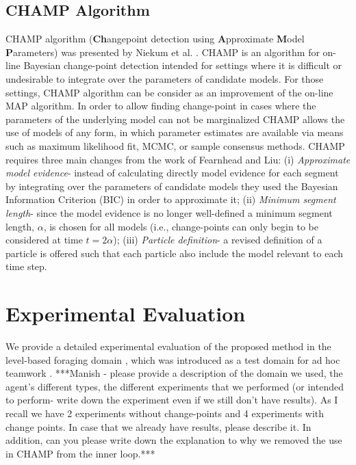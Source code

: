 \documentclass{article}
\begin{document}
\subsection{CHAMP Algorithm}
CHAMP algorithm (\textbf{Ch}angepoint detection using \textbf{A}pproximate \textbf{M}odel \textbf{P}arameters) was presented by Niekum et al. \cite{niekum2014champ}. CHAMP is an algorithm for on-line Bayesian change-point detection intended for settings where it is difficult or undesirable to integrate over the parameters of candidate models. For those settings, CHAMP algorithm can be consider as an improvement of the on-line MAP algorithm. In order to allow finding change-point in cases where the parameters of the underlying model can not be marginalized CHAMP allows the use of models of any form, in which parameter estimates are available via means such as maximum likelihood fit, MCMC, or sample consensus methods. CHAMP requires three main changes from the work of Fearnhead and Liu: (i) \textit{Approximate model evidence}- instead of calculating directly model evidence for each segment by integrating over the parameters of candidate models they used the Bayesian Information Criterion (BIC) in order to approximate it; (ii) \textit{Minimum segment length}- since the model evidence is no longer well-defined a minimum segment length, $\alpha$, is chosen for all models (i.e., change-points can only begin to be considered at time $t = 2\alpha$); (iii) \textit{Particle definition}- a revised definition of a particle is offered such that each particle also include the model relevant to each time step. 
 

\section{Experimental Evaluation}
We provide a detailed experimental evaluation of the proposed method in the level-based foraging domain \cite{albrecht2013game}, which was introduced as a test domain for ad hoc teamwork \cite{stone2010ad}. 
\color{red}***Manish - please provide a description of the domain we used, the agent's different types, the different experiments that we performed (or intended to perform- write down the experiment even if we still don't have results). As I recall we have 2 experiments without change-points and 4 experiments with change points. In case that we already have results, please describe it. In addition, can you please write down the explanation to why we removed the use in CHAMP from the inner loop.***
\end{document}
